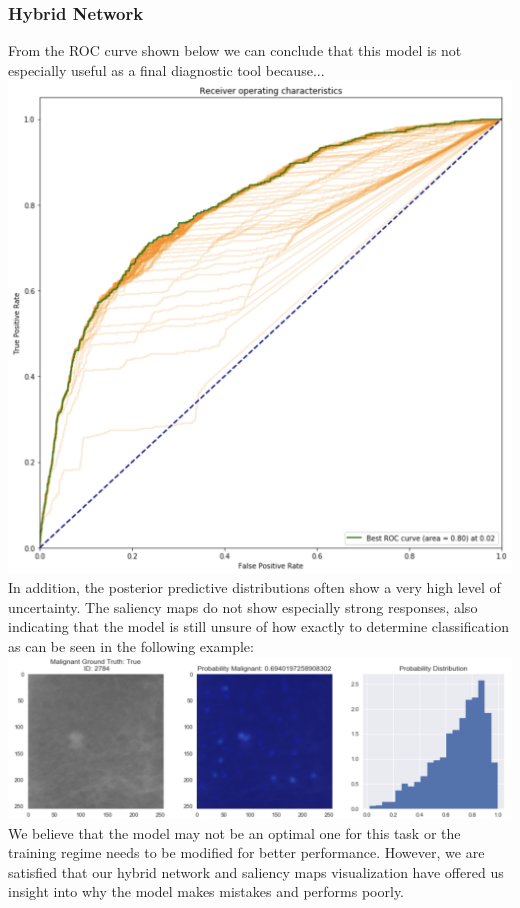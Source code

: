 \documentclass[12pt]{article}
\begin{document}
{\subsubsection*{Hybrid Network}
From the ROC curve shown below we can conclude that this model is not especially useful as a final diagnostic tool because... \\
\includegraphics[scale=0.5]{DDSM_ROC.png} \\
In addition, the posterior predictive distributions often show a very high level of uncertainty. The saliency maps do not show especially strong responses,  also indicating that the model is still unsure of how exactly to determine classification as can be seen in the following example: \\
\includegraphics[scale=0.5]{hybrid_model_confusion.png} \\
We believe that the model may not be an optimal one for this task or the training regime needs to be modified for better performance. However, we are satisfied that our hybrid network and saliency maps visualization have offered us insight into why the model makes mistakes and performs poorly.

}
\end{document}
